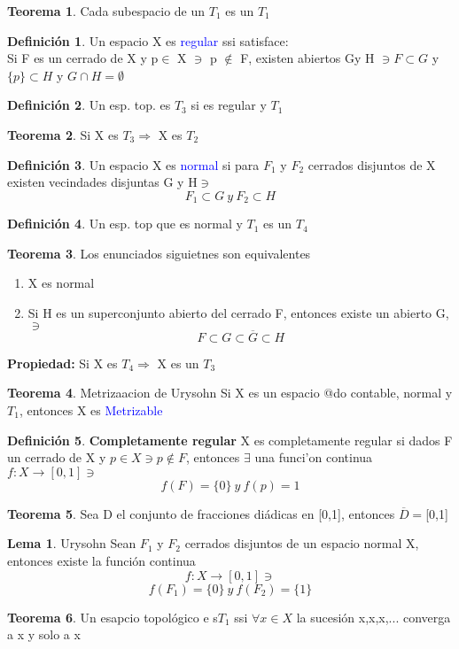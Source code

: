 \documentclass{article}
\theoremstyle{definition}
\newtheorem{definition}{Definición}[section]
\newtheorem{theorem}{Teorema}[section]
\newtheorem{lemma}{Lema}[section]
\begin{document}
\begin{theorem}
	Cada subespacio de un $T_1$ es un $T_1$
\end{theorem}
\begin{definition}
	Un espacio X es \textcolor{blue}{regular} ssi satisface:\\
	Si F es un cerrado de X y p$\in$ X $\ni$ p $\not\in$ F, existen abiertos Gy H $\ni F\subset G$ y $\{p\}\subset H$ y $G\cap H=\emptyset$
\end{definition}
\begin{definition}
	Un esp. top. es $T_3$ si es regular y $T_1$
\end{definition}
\begin{theorem}
	Si X es $T_3\Rightarrow$ X es $T_2$
\end{theorem}
\begin{definition}
	Un espacio X es \textcolor{blue}{normal} si para $F_1$ y $F_2$ cerrados disjuntos de X existen vecindades disjuntas G y H$\ni$
	\[F_1\subset G\ y \ F_2\subset H\]
\end{definition}
\begin{definition}
	Un esp. top que es normal y $T_1$ es un $T_4$
\end{definition}
\begin{theorem}

	Los enunciados siguietnes son equivalentes
	\begin{enumerate}
		\item X es normal
		\item Si H es un superconjunto abierto del cerrado F, entonces existe un abierto G, $\ni$
		\[F\subset G\subset \overline{G}\subset H\]
	\end{enumerate}
\end{theorem}
\textbf{Propiedad: }
Si X es $T_4\Rightarrow$ X es un $T_3$
\begin{theorem}{Metrizaacion de Urysohn}
	Si X es un espacio @do contable, normal y $T_1$, entonces X es \textcolor{blue}{Metrizable}
\end{theorem}
\begin{definition}\textbf{Completamente regular}
	X es completamente regular si dados F un cerrado de X y $p\in X\ni p\not\in F$, entonces $\exists$ una funci'on continua $f:X\to [0,1]\ni$
	\[f(F)=\{0\}\ y \ f(p)= 1\]
\end{definition}
\begin{theorem}
	Sea D el conjunto de fracciones diádicas en [0,1], entonces $\overline{D}=$[0,1]
\end{theorem}
\begin{lemma}{Urysohn}
	Sean $F_1$ y $F_2$ cerrados disjuntos de un espacio normal X, entonces existe la función continua 
	\[f:X\to[0,1]\ni\]
	\[f(F_1)=\{0\}\ y \ f(F_2)=\{1\}\]
\end{lemma}
\begin{theorem}
	Un esapcio topológico e s$T_1$ ssi $\forall x\in X$ la sucesión x,x,x,... converga a x y solo a x
\end{theorem}
\end{document}
